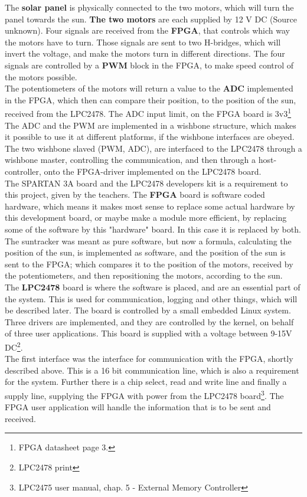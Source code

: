The \textbf{solar panel} is physically connected to the two motors, which will turn the panel towards the sun. \textbf{The two motors} are each supplied by 12 V DC (Source unknown). Four signals are received from the \textbf{FPGA}, that controls which way the motors have to turn. Those signals are sent to two H-bridges, which will invert the voltage, and make the motors turn in different directions. The four signals are controlled by a \textbf{PWM} block in the FPGA, to make speed control of the motors possible. \\
The potentiometers of the motors will return a value to the \textbf{ADC} implemented in the FPGA, which then can compare their position, to the position of the sun, received from the LPC2478. The ADC input limit, on the FPGA board is 3v3\footnote{FPGA datasheet page 3.}\\
The ADC and the PWM are implemented in a wishbone structure, which makes it possible to use it at different platforms, if the wishbone interfaces are obeyed. The two wishbone slaved (PWM, ADC), are interfaced to the LPC2478 through a wishbone master, controlling the communication, and then through a host-controller, onto the FPGA-driver implemented on the LPC2478 board. \\
The SPARTAN 3A board and the LPC2478 developers kit is a requirement to this project, given by the teachers. The \textbf{FPGA} board is software coded hardware, which means it makes most sense to replace some actual hardware by this development board, or maybe make a module more efficient, by replacing some of the software by this "hardware" board. In this case it is replaced by both. The suntracker was meant as pure software, but now a formula, calculating the position of the sun, is implemented as software, and the position of the sun is sent to the FPGA; which compares it to the position of the motors, received by the potentiometers, and then repositioning the motors, according to the sun. \\
The \textbf{LPC2478} board is where the software is placed, and are an essential part of the system. This is used for communication, logging and other things, which will be described later. The board is controlled by a small embedded Linux system. Three drivers are implemented, and they are controlled by the kernel, on behalf of three user applications. This board is supplied with a voltage between 9-15V DC\footnote{LPC2478 print}. \\
The first interface was the interface for communication with the FPGA, shortly described above. This is a 16 bit communication line, which is also a requirement for the system. Further there is a chip select, read and write line and finally a supply line, supplying the FPGA with power from the LPC2478 board\footnote{LPC2475 user manual, chap. 5 - External Memory Controller}. The FPGA user application will handle the information that is to be sent and received. \\
